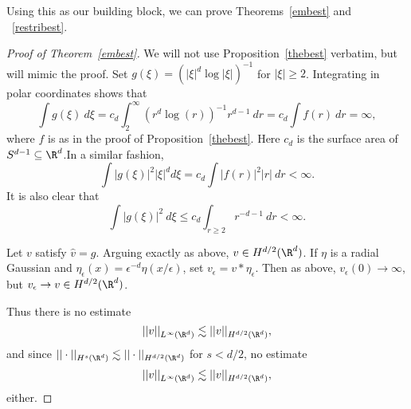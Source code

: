 \documentclass[12pt]{article}
\begin{document}
Using this as our building block, we can prove Theorems~\ref{embest} and ~\ref{restribest}.
\begin{proof}[Proof of Theorem~\ref{embest}]We will not use Proposition~\ref{thebest} verbatim, but will mimic the proof. Set $g(\xi) = (|\xi|^{d}\log|\xi|)^{-1}$ for $|\xi| \geq 2$. Integrating in polar coordinates shows that
\[\int g(\xi)\ d\xi = c_d\int_2^\infty (r^d\log(r))^{-1}r^{d-1}\ dr = c_d\int f(r)\ dr = \infty,\]
where $f$ is as in the proof of Proposition~\ref{thebest}. Here $c_d$ is the surface area of $S^{d-1} \subseteq \R^d$.In a similar fashion,
\[\int |g(\xi)|^2|\xi|^{d} d\xi = c_d\int |f(r)|^2|r|\ dr < \infty.\] It is also clear that
\[\int |g(\xi)|^2\ d\xi \leq c_d\int_{r \geq 2} r^{-d-1}\ dr < \infty.\]

Let $v$ satisfy $\hat{v} = g$. Arguing exactly as above, $v \in H^{d/2}(\R^{d})$. If $\eta$ is a radial Gaussian and $\eta_\epsilon(x) = \epsilon^{-d}\eta(x/\epsilon)$, set $v_\epsilon = v\ast\eta_\epsilon$. Then as above, $v_\epsilon(0) \to \infty$, but $v_\epsilon \to v \in H^{d/2}(\R^d)$. 

Thus there is no estimate \[||v||_{L^\infty(\R^d)} \lesssim ||v||_{H^{d/2}(\R^d)},\] and since $||\cdot ||_{H^{s}(\R^d)} \lesssim ||\cdot ||_{H^{d/2}(\R^d)}$ for $s < d/2$, no estimate 
\[||v||_{L^\infty(\R^d)} \lesssim ||v||_{H^{d/2}(\R^d)},\]
either.\end{proof}
\end{document}
